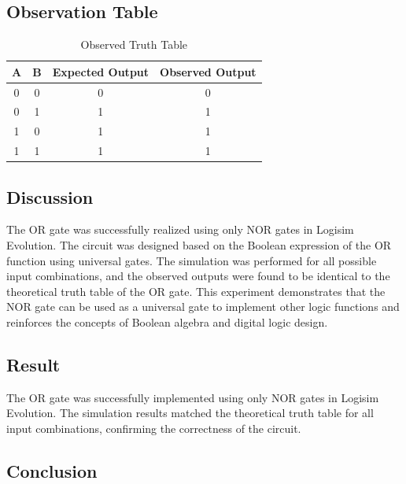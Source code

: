 \documentclass[12pt,a4paper]{article}
\begin{document}
\subsection{Observation Table}

\begin{table}[H]
\centering
\caption{Observed Truth Table}
\label{tab:observation}
\begin{tabular}{|c|c|c|c|}
\hline
A & B & Expected Output & Observed Output\\
\hline
0 & 0 & 0 & 0\\
0 & 1 & 1 & 1\\
1 & 0 & 1 & 1\\
1 & 1 & 1 & 1\\
\hline
\end{tabular}
\end{table}


\subsection{Discussion}

The OR gate was successfully realized using only NOR gates in Logisim Evolution. The circuit was designed based on the Boolean expression of the OR function using universal gates. The simulation was performed for all possible input combinations, and the observed outputs were found to be identical to the theoretical truth table of the OR gate. This experiment demonstrates that the NOR gate can be used as a universal gate to implement other logic functions and reinforces the concepts of Boolean algebra and digital logic design.


\subsection{Result}

The OR gate was successfully implemented using only NOR gates in Logisim Evolution. The simulation results matched the theoretical truth table for all input combinations, confirming the correctness of the circuit.


\subsection{Conclusion}
\end{document}

